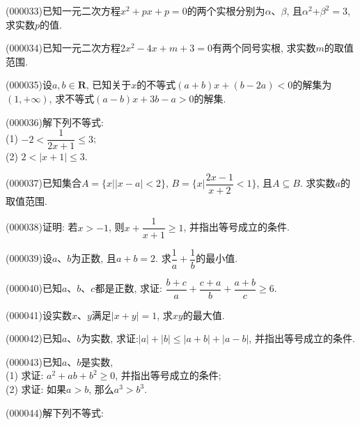 \begin{center}
\end{center}
\item (000033)已知一元二次方程$x^2+px+p=0$的两个实根分别为$\alpha$、$\beta$, 且$\alpha^2$+$\beta^2=3$, 求实数$p$的值.
\item (000034)已知一元二次方程$2x^2-4x+m+3=0$有两个同号实根, 求实数$m$的取值范围.
\item (000035)设$a,b\in \mathbf{R}$, 已知关于$x$的不等式$(a+b)x+(b-2a)<0$的解集为$(1, +\infty)$, 求不等式$(a-b)x+3b-a>0$的解集.
\item (000036)解下列不等式:\\
(1) $-2< \dfrac 1{2x+1}\le 3$;\\
(2) $2<|x+1|\le 3$.
\item (000037)已知集合$A=\{x||x-a|<2\}$, $B=\{x|\dfrac{2x-1}{x+2}<1\}$, 且$A\subseteq B$. 求实数$a$的取值范围.
\item (000038)证明: 若$x>-1$, 则$x+\dfrac 1{x+1}\ge 1$, 并指出等号成立的条件.
\item (000039)设$a$、$b$为正数, 且$a+b=2$. 求$\dfrac 1a+\dfrac 1b$的最小值.
\item (000040)已知$a$、$b$、$c$都是正数, 求证: $\dfrac{b+c}{a}+\dfrac{c+a}{b}+\dfrac{a+b}{c}\ge 6$.
\item (000041)设实数$x$、$y$满足$|x+y|=1$, 求$xy$的最大值.
\item (000042)已知$a$、$b$为实数, 求证:$|a|+|b| \le |a+b| +|a-b|$, 并指出等号成立的条件.
\item (000043)已知$a$、$b$是实数,\\
(1) 求证: $a^2+ab+b^2\ge 0$, 并指出等号成立的条件;\\
(2) 求证: 如果$a>b$, 那么$a^3>b^3$.
\item (000044)解下列不等式:\\
